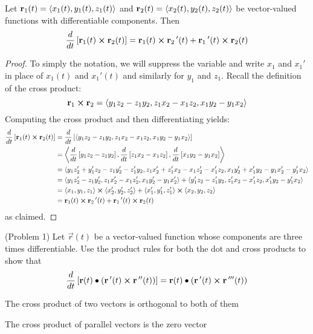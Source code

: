 \documentclass[handout]{ximera}
\begin{document}
\begin{proposition}
Let $\mathbf r_1(t) = \left\langle x_1(t), y_1(t),z_1(t)\right\rangle$ and $\mathbf r_2(t) = \left\langle x_2(t), y_2(t),z_2(t)\right\rangle$ be vector-valued functions with differentiable components.
Then
\[
\frac{d}{dt}\left[\mathbf r_1(t) \boldsymbol\times \mathbf r_2(t)\right] = \mathbf r_1(t) \boldsymbol\times \mathbf r_2\,'(t) + \mathbf r_1\,'(t) \boldsymbol\times \mathbf r_2(t)
\]
\end{proposition}
\begin{proof}
To simply the notation, we will suppress the variable and write $x_1$ and $x_1'$ in place of $x_1(t)$ and $x_1'(t)$ and similarly for $y_1$ and $z_1$.
Recall the definition of the cross product:
\[
\mathbf{r}_1 \boldsymbol\times \mathbf{r}_2 =  \left\langle y_1z_2 - z_1y_2, z_1x_2 - x_1z_2, x_1y_2 - y_1x_2\right\rangle
\]
Computing the cross product and then differentiating yields:
\begin{align*}
\frac{d}{dt}\left[\mathbf r_1(t) \boldsymbol\times \mathbf r_2(t)\right] &= \frac{d}{dt} \left[ \left\langle y_1z_2 - z_1y_2, z_1x_2 - x_1z_2, x_1y_2 - y_1x_2\right\rangle\right]\\
&=  \left\langle \frac{d}{dt} \left[y_1z_2 - z_1y_2\right], \frac{d}{dt} \left[z_1x_2 - x_1z_2\right],\frac{d}{dt} \left[x_1y_2 - y_1x_2\right]\right\rangle\\
&= \left\langle y_1z_2' + y_1'z_2- z_1y_2'  - z_1'y_2,  z_1x_2' + z_1'x_2- x_1z_2'  - x_1'z_2, x_1y_2' +x_1'y_2- y_1x_2'  - y_1'x_2      \right\rangle\\
&=\left\langle y_1z_2' - z_1y_2'  ,  z_1x_2' - x_1z_2', x_1y_2' - y_1x_2'\right\rangle+ \left\langle  y_1'z_2  - z_1'y_2, z_1'x_2 - x_1'z_2, x_1'y_2 - y_1'x_2\right\rangle\\
&= \left\langle x_1, y_1, z_1\right\rangle\boldsymbol\times \left\langle x_2', y_2', z_2'\right\rangle + \left\langle x_1', y_1', z_1'\right\rangle\boldsymbol\times \left\langle x_2, y_2, z_2\right\rangle\\
&= \mathbf r_1(t) \boldsymbol\times \mathbf r_2\,'(t) + \mathbf r_1\,'(t) \boldsymbol\times \mathbf r_2(t)
\end{align*}
as claimed.


\end{proof}


\begin{problem}(Problem 1)
Let $\vec r(t)$ be a vector-valued function whose components are three times differentiable. Use the product rules for both the dot and cross products to show that
\[
\frac{d}{dt}\left[\mathbf r(t) \bullet \left(\mathbf r\,'(t) \boldsymbol\times \mathbf r\,''(t)\right)\right] = \mathbf r(t) \bullet \left(\mathbf r\,'(t) \boldsymbol\times \mathbf r\,'''(t)\right)
\]
\begin{hint}
The cross product of two vectors is orthogonal to both of them
\end{hint}
\begin{hint}
The cross product of parallel vectors is the zero vector
\end{hint}
\end{problem}
\end{document}
